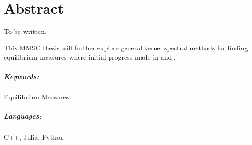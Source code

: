 \chapter*{Abstract}
\label{chap:abstract}
To be written.

This MMSC thesis will further explore general kernel spectral methods for finding equilibrium measures where initial progress made in \cite{2020-power-law-kernels} and \cite{2021-arbitrary-dimensions}.

\paragraph{Keywords:}
Equilibrium Measures


\paragraph{Languages:}
C++, Julia, Python
